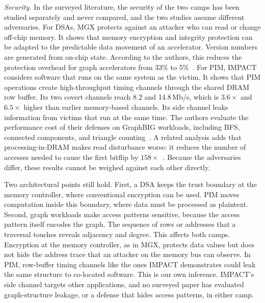 \documentclass[journal,onecolumn]{IEEEtran}
\begin{document}
\emph{Security.} In the surveyed literature, the security of the two camps has been studied separately and never compared, and the two studies assume different adversaries. For DSAs, MGX protects against an attacker who can read or change off-chip memory. It shows that memory encryption and integrity protection can be adapted to the predictable data movement of an accelerator. Version numbers are generated from on-chip state. According to the authors, this reduces the protection overhead for graph accelerators from 33\% to 5\%~\cite{hua2022mgx}. For PIM, IMPACT considers software that runs on the same system as the victim. It shows that PIM operations create high-throughput timing channels through the shared DRAM row buffer. Its two covert channels reach 8.2 and 14.8\,Mb/s, which is $3.6\times$ and $6.5\times$ higher than earlier memory-based channels. Its side channel leaks information from victims that run at the same time. The authors evaluate the performance cost of their defenses on GraphBIG workloads, including BFS, connected components, and triangle counting~\cite{bostanci2025impact}. A related analysis adds that processing-in-DRAM makes read disturbance worse: it reduces the number of accesses needed to cause the first bitflip by $158\times$~\cite{yuksel2026pid}. Because the adversaries differ, these results cannot be weighed against each other directly.

Two architectural points still hold. First, a DSA keeps the trust boundary at the memory controller, where conventional encryption can be used. PIM moves computation inside this boundary, where data must be processed as plaintext. Second, graph workloads make access patterns sensitive, because the access pattern itself encodes the graph. The sequence of rows or addresses that a traversal touches reveals adjacency and degree. This affects both camps. Encryption at the memory controller, as in MGX, protects data values but does not hide the address trace that an attacker on the memory bus can observe. In PIM, row-buffer timing channels like the ones IMPACT demonstrates could leak the same structure to co-located software. This is our own inference. IMPACT's side channel targets other applications, and no surveyed paper has evaluated graph-structure leakage, or a defense that hides access patterns, in either camp.
\end{document}
